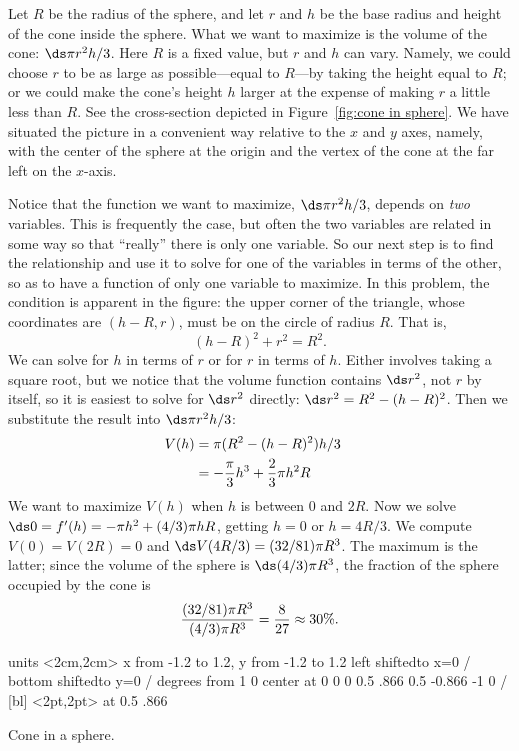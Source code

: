 \begin{solution} 
Let $R$ be the radius of the sphere, and let $r$ and $h$ be the base radius
and height of the cone inside the sphere.  What we want to maximize is the
volume of the cone: $\ds \pi r^2h/3$.  Here $R$ is a fixed value, but
$r$ and $h$ can vary.  Namely, we could choose $r$ to be as large as
possible---equal to $R$---by taking the height equal to $R$; or we
could make the cone's height $h$ larger at the expense of making $r$ a
little less than $R$.  See the cross-section depicted in
Figure~\ref{fig:cone in sphere}. We
have situated the picture in a convenient way relative to the $x$ and
$y$ axes, namely, with the center of the sphere at the origin and the
vertex of the cone at the far left on the $x$-axis.

Notice that the function we want to maximize, $\ds \pi r^2h/3$,
depends on {\it two} variables.  This is frequently the case, but
often the two variables are related in some way so that ``really''
there is only one variable. So our next step is to
find the relationship and use it to solve for one of the variables in
terms of the other, so as to have a function of only one variable to
maximize.  In this problem, the condition is apparent in the figure:
the upper corner of the triangle, whose coordinates are $(h-R,r)$,
must be on the circle of radius $R$.  That is,
$$
	(h-R)^2+r^2=R^2.
$$ 
We can solve for $h$ in terms of $r$ or for $r$ in terms of $h$.
Either involves taking a square root, but we notice that the volume
function contains $\ds r^2$, not $r$ by itself, so it is easiest to solve
for $\ds r^2$ directly: $\ds r^2=R^2-(h-R)^2$.
Then we substitute the result into $\ds \pi r^2h/3$:
\begin{eqnarray*}
V(h)&=\pi(R^2-(h-R)^2)h/3\cr
&=-{\pi\over3}h^3+{2\over3}\pi h^2R\cr 
\end{eqnarray*} 
We want to maximize $V(h)$ when $h$ is between 0 and $2R$.  Now we
solve $\ds 0=f'(h)=-\pi h^2+(4/3)\pi h R$, getting $h=0$ or $h=4R/3$. 
We compute $V(0)=V(2R)=0$ and $\ds V(4R/3)=(32/81)\pi R^3$. The maximum is
the latter; since the volume of the sphere is $\ds (4/3)\pi R^3$, the
fraction of the sphere occupied by the cone is 
$${(32/81)\pi R^3\over (4/3)\pi R^3}={8\over 27}\approx 30\%.$$
\end{solution}

\figure[H]
\centerline{\vbox{\beginpicture
		\normalgraphs
		\setcoordinatesystem units <2cm,2cm>
		\setplotarea x from -1.2 to 1.2, y from -1.2 to 1.2
		\axis left shiftedto x=0 /
		\axis bottom shiftedto y=0 /
		\setquadratic
		 degrees from 1 0 center at 0 0
		\setlinear
		 0 0.5 .866 0.5 -0.866 -1 0 /
		 <2pt,2pt> at 0.5 .866
		\endpicture}}
\caption{Cone in a sphere. \label{fig:cone in sphere}}
\endfigure

